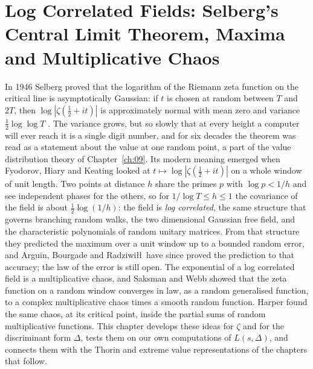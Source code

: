 \chapter[Log Correlated Fields]{Log Correlated Fields: Selberg's Central Limit Theorem, Maxima and Multiplicative Chaos}\label{ch:09b}

In 1946 Selberg proved that the logarithm of the Riemann zeta function on the critical line is asymptotically Gaussian: if $t$ is chosen at random between $T$ and $2T$, then $\log|\zeta(\frac12+it)|$ is approximately normal with mean zero and variance $\frac12\log\log T$ \cite{selberg1946}. The variance grows, but so slowly that at every height a computer will ever reach it is a single digit number, and for six decades the theorem was read as a statement about the value at one random point, a part of the value distribution theory of Chapter~\ref{ch:09}. Its modern meaning emerged when Fyodorov, Hiary and Keating \cite{fhk2012} looked at $t\mapsto\log|\zeta(\frac12+it)|$ on a whole window of unit length. Two points at distance $h$ share the primes $p$ with $\log p<1/h$ and see independent phases for the others, so for $1/\log T\le h\le1$ the covariance of the field is about $\frac12\log(1/h)$: the field is \emph{log correlated}, the same structure that governs branching random walks, the two dimensional Gaussian free field, and the characteristic polynomials of random unitary matrices. From that structure they predicted the maximum over a unit window up to a bounded random error, and Arguin, Bourgade and Radziwi\l\l\ have since proved the prediction to that accuracy; the law of the error is still open. The exponential of a log correlated field is a multiplicative chaos, and Saksman and Webb showed that the zeta function on a random window converges in law, as a random generalised function, to a complex multiplicative chaos times a smooth random function. Harper found the same chaos, at its critical point, inside the partial sums of random multiplicative functions. This chapter develops these ideas for $\zeta$ and for the discriminant form $\Delta$, tests them on our own computations of $L(s,\Delta)$, and connects them with the Thorin and extreme value representations of the chapters that follow.

